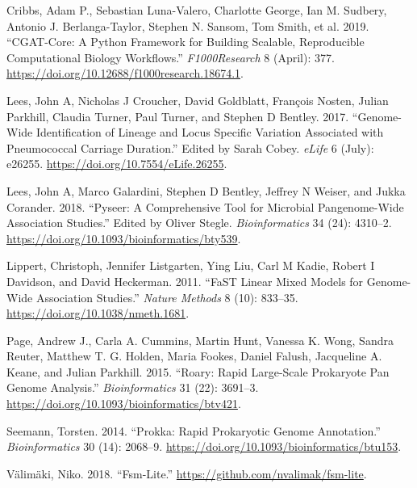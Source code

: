 \documentclass[]{DissertateUSU}
\begin{document}
\hypertarget{refs}{}
\leavevmode\hypertarget{ref-cribbs_cgat-core:_2019}{}%
Cribbs, Adam P., Sebastian Luna-Valero, Charlotte George, Ian M.
Sudbery, Antonio J. Berlanga-Taylor, Stephen N. Sansom, Tom Smith, et
al. 2019. ``CGAT-Core: A Python Framework for Building Scalable,
Reproducible Computational Biology Workflows.'' \emph{F1000Research} 8
(April): 377. \url{https://doi.org/10.12688/f1000research.18674.1}.

\leavevmode\hypertarget{ref-lees_genome-wide_2017}{}%
Lees, John A, Nicholas J Croucher, David Goldblatt, François Nosten,
Julian Parkhill, Claudia Turner, Paul Turner, and Stephen D Bentley.
2017. ``Genome-Wide Identification of Lineage and Locus Specific
Variation Associated with Pneumococcal Carriage Duration.'' Edited by
Sarah Cobey. \emph{eLife} 6 (July): e26255.
\url{https://doi.org/10.7554/eLife.26255}.

\leavevmode\hypertarget{ref-lees_pyseer:_2018}{}%
Lees, John A, Marco Galardini, Stephen D Bentley, Jeffrey N Weiser, and
Jukka Corander. 2018. ``Pyseer: A Comprehensive Tool for Microbial
Pangenome-Wide Association Studies.'' Edited by Oliver Stegle.
\emph{Bioinformatics} 34 (24): 4310--2.
\url{https://doi.org/10.1093/bioinformatics/bty539}.

\leavevmode\hypertarget{ref-lippert_fast_2011}{}%
Lippert, Christoph, Jennifer Listgarten, Ying Liu, Carl M Kadie, Robert
I Davidson, and David Heckerman. 2011. ``FaST Linear Mixed Models for
Genome-Wide Association Studies.'' \emph{Nature Methods} 8 (10):
833--35. \url{https://doi.org/10.1038/nmeth.1681}.

\leavevmode\hypertarget{ref-page_roary:_2015}{}%
Page, Andrew J., Carla A. Cummins, Martin Hunt, Vanessa K. Wong, Sandra
Reuter, Matthew T. G. Holden, Maria Fookes, Daniel Falush, Jacqueline A.
Keane, and Julian Parkhill. 2015. ``Roary: Rapid Large-Scale Prokaryote
Pan Genome Analysis.'' \emph{Bioinformatics} 31 (22): 3691--3.
\url{https://doi.org/10.1093/bioinformatics/btv421}.

\leavevmode\hypertarget{ref-seemann_prokka:_2014}{}%
Seemann, Torsten. 2014. ``Prokka: Rapid Prokaryotic Genome Annotation.''
\emph{Bioinformatics} 30 (14): 2068--9.
\url{https://doi.org/10.1093/bioinformatics/btu153}.

\leavevmode\hypertarget{ref-valimaki_fsm-lite_2018}{}%
Välimäki, Niko. 2018. ``Fsm-Lite.''
\url{https://github.com/nvalimak/fsm-lite}.
\end{document}
